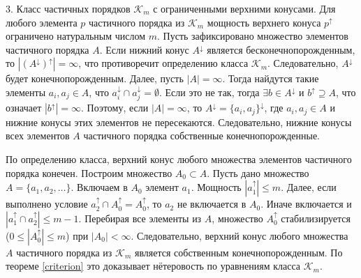 \documentclass[12pt]{article}
\theoremstyle{break}
\def\K{\mathcal{K}_m}
\begin{document}
		3. Класс частичных порядков $\K$ с ограниченными верхними конусами. Для любого элемента $p$ частичного порядка из $\K$ мощность верхнего конуса $p^{\uparrow}$ ограничено натуральным числом $m$. Пусть зафиксировано множество элементов частичного порядка $A$. Если нижний конус $A^{\downarrow}$ является бесконечнопорожденным, то $|(A^{\downarrow})^{\uparrow}| = \infty$, что противоречит определению класса $\K$. Следовательно, $A^{\downarrow}$ будет конечнопорожденным. Далее, пусть $|A| = \infty$. Тогда найдутся такие элементы $a_{i}, a_{j}\in A$, что $a_{i}^{\downarrow} \cap a_{j}^{\downarrow} = \emptyset$. Если это не так, тогда $\exists b\in A^{\downarrow}$ и $b^{\uparrow} \supseteq A$, что означает $|b^{\uparrow}| = \infty$. Поэтому, если $|A|=\infty$, то $A^{\downarrow} = \{a_i, a_j\}^{\downarrow}$, где $a_i, a_j\in A$ и нижние конусы этих элементов не пересекаются. Следовательно, нижние конусы всех элементов $A$ частичного порядка собственные конечнопорожденные.

		По определению класса, верхний конус любого множества элементов частичного порядка конечен. Построим множество $A_0\subset A$. Пусть дано множество $A = \{a_1, a_2,\dots\}.$ Включаем в $A_0$ элемент $a_1$. Мощность $|a_1^{\uparrow}| \leqslant m.$ Далее, если выполнено условие $a_2^{\uparrow} \cap A_0^{\uparrow} = A_0^{\uparrow}$, то $a_2$ не включается в $A_0$. Иначе включается и $|a_1^{\uparrow} \cap a_2^{\uparrow}| \leqslant m-1$. Перебирая все элементы из $A$, множество $A_0^{\uparrow}$ стабилизируется ($0 \leqslant |A_0^{\uparrow}| \leqslant m$) при $|A_0|<\infty$. Следовательно, верхний конус любого множества $A$ частичного порядка из $\K$ является собственным конечнопорожденным. По теореме \ref{criterion} это доказывает нётеровость по уравнениям класса $\K$.
	
\end{document}
